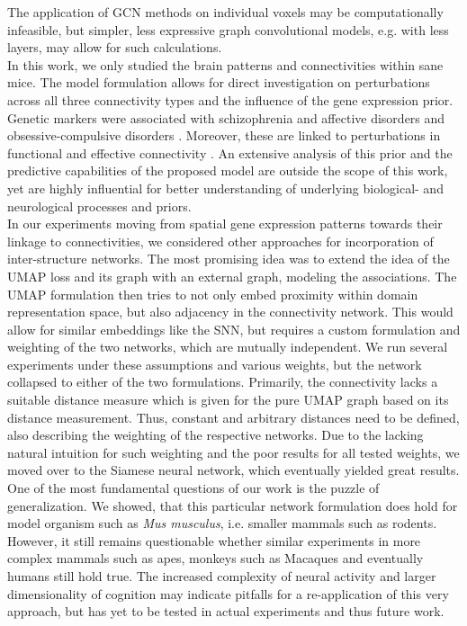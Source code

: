 \documentclass[]{article}
\renewcommand{\cite}{\citep}
\begin{document}
The application of GCN methods on individual voxels may be computationally infeasible, but simpler, less expressive graph convolutional models, e.g. with less layers, may allow for such calculations.\\

In this work, we only studied the brain patterns and connectivities within sane mice. The model formulation allows for direct investigation on perturbations across all three connectivity types and the influence of the gene expression prior. Genetic markers were associated with schizophrenia and affective disorders \cite{blackwood2001schizophrenia} and obsessive-compulsive disorders \cite{hall2003sequence}. Moreover, these are linked to perturbations in functional and effective connectivity \cite{friston2002dysfunctional, friston2011functional}. An extensive analysis of this prior and the predictive capabilities of the proposed model are outside the scope of this work, yet are highly influential for better understanding of underlying biological- and neurological processes and priors.\\

In our experiments moving from spatial gene expression patterns towards their linkage to connectivities, we considered other approaches for incorporation of inter-structure networks. The most promising idea was to extend the idea of the UMAP loss and its graph with an external graph, modeling the associations. The UMAP formulation then tries to not only embed proximity within domain representation space, but also adjacency in the connectivity network. This would allow for similar embeddings like the SNN, but requires a custom formulation and weighting of the two networks, which are mutually independent. We run several experiments under these assumptions and various weights, but the network collapsed to either of the two formulations. Primarily, the connectivity lacks a suitable distance measure which is given for the pure UMAP graph based on its distance measurement. Thus, constant and arbitrary distances need to be defined, also describing the weighting of the respective networks. Due to the lacking natural intuition for such weighting and the poor results for all tested weights, we moved over to the Siamese neural network, which eventually yielded great results.\\

One of the most fundamental questions of our work is the puzzle of generalization. We showed, that this particular network formulation does hold for model organism such as \textit{Mus musculus}, i.e. smaller mammals such as rodents. However, it still remains questionable whether similar experiments in more complex mammals such as apes, monkeys such as Macaques \cite{ValkShapingBrainStructure2020} and eventually humans still hold true. The increased complexity of neural activity and larger dimensionality of cognition may indicate pitfalls for a re-application of this very approach, but has yet to be tested in actual experiments and thus future work.\\
\end{document}
